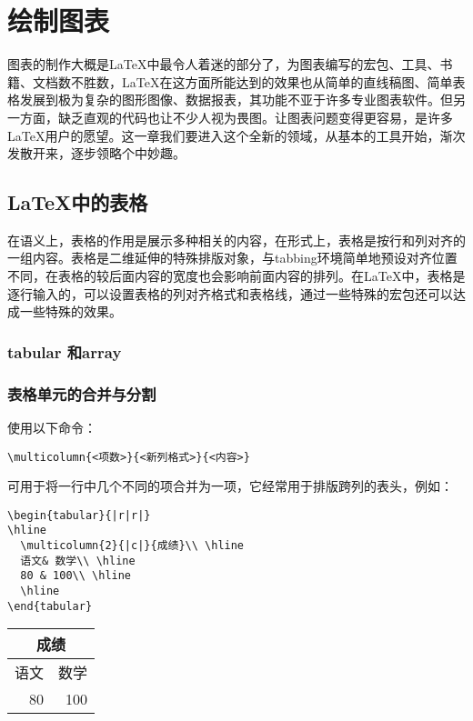 \chapter{绘制图表}
图表的制作大概是\LaTeX 中最令人着迷的部分了，为图表编写的宏包、工具、书籍、文档数不胜数，\LaTeX 在这方面所能达到的效果也从简单的直线稿图、简单表格发展到极为复杂的图形图像、数据报表，其功能不亚于许多专业图表软件。但另一方面，缺乏直观的代码也让不少人视为畏图。让图表问题变得更容易，是许多\LaTeX 用户的愿望。这一章我们要进入这个全新的领域，从基本的工具开始，渐次发散开来，逐步领略个中妙趣。
\section{\LaTeX 中的表格}
在语义上，表格的作用是展示多种相关的内容，在形式上，表格是按行和列对齐的一组内容。表格是二维延伸的特殊排版对象，与tabbing环境简单地预设对齐位置不同，在表格的较后面内容的宽度也会影响前面内容的排列。在\LaTeX 中，表格是逐行输入的，可以设置表格的列对齐格式和表格线，通过一些特殊的宏包还可以达成一些特殊的效果。
\subsection{tabular 和array }
\subsection{表格单元的合并与分割}
使用以下命令：

\verb|\multicolumn{<项数>}{<新列格式>}{<内容>}|

可用于将一行中几个不同的项合并为一项，它经常用于排版跨列的表头，例如：

\begin{table}[ht]
\begin{minipage}{0.7\linewidth}
\begin{lstlisting}
\begin{tabular}{|r|r|}
\hline
  \multicolumn{2}{|c|}{成绩}\\ \hline
  语文& 数学\\ \hline
  80 & 100\\ \hline
  \hline
\end{tabular}
\end{lstlisting}
\end{minipage}
	\quad
	\begin{tabular}{|r|r|}
		\hline
		\multicolumn{2}{|c|}{成绩}\\ \hline
		语文& 数学\\ \hline
		80 & 100\\ \hline
	\end{tabular}
\end{table}

